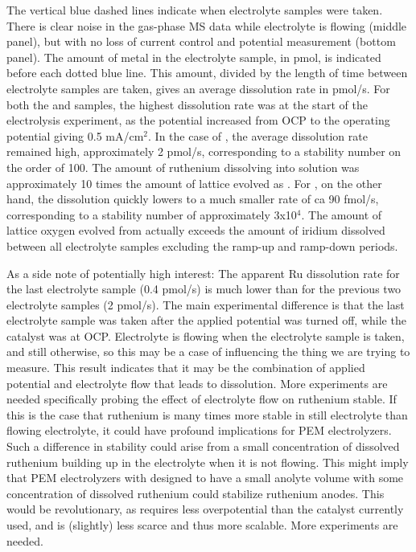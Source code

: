 The vertical blue dashed lines indicate when electrolyte samples were taken. There is clear noise in the gas-phase MS data while electrolyte is flowing (middle panel), but with no loss of current control and potential measurement (bottom panel). The amount of metal in the electrolyte sample, in pmol, is indicated before each dotted blue line. This amount, divided by the length of time between electrolyte samples are taken, gives an average dissolution rate in pmol/s. For both the  and  samples, the highest dissolution rate was at the start of the electrolysis experiment, as the potential increased from OCP to the operating potential giving 0.5 mA/cm$^2$. In the case of , the average dissolution rate remained high, approximately 2 pmol/s, corresponding to a stability number on the order of 100. The amount of ruthenium dissolving into solution was approximately 10 times the amount of lattice  evolved as . For , on the other hand, the dissolution quickly lowers to a much smaller rate of ca 90 fmol/s, corresponding to a stability number of approximately 3x10$^4$. The amount of lattice oxygen evolved from  actually exceeds the amount of iridium dissolved between all electrolyte samples excluding the ramp-up and ramp-down periods.

As a side note of potentially high interest: The apparent Ru dissolution rate for the last electrolyte sample (0.4 pmol/s) is much lower than for the previous two electrolyte samples (2 pmol/s). The main experimental difference is that the last electrolyte sample was taken after the applied potential was turned off, while the catalyst was at OCP. Electrolyte is flowing when the electrolyte sample is taken, and still otherwise, so this may be a case of influencing the thing we are trying to measure. This result indicates that it may be the combination of applied potential and electrolyte flow that leads to  dissolution. More experiments are needed specifically probing the effect of electrolyte flow on ruthenium stable. If this is the case that ruthenium is many times more stable in still electrolyte than flowing electrolyte, it could have profound implications for PEM electrolyzers. Such a difference in stability could arise from a small concentration of dissolved ruthenium building up in the electrolyte when it is not flowing. This might imply that PEM electrolyzers with  designed to have a small anolyte volume with some concentration of dissolved ruthenium could stabilize ruthenium anodes. This would be revolutionary, as  requires less overpotential than the  catalyst currently used, and is (slightly) less scarce and thus more scalable. More experiments are needed.

